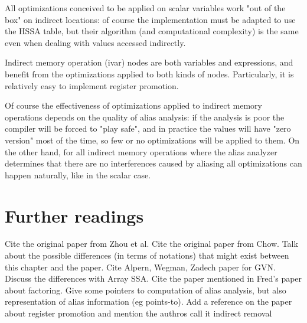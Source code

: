 All optimizations conceived to be applied on scalar variables work "out of the box" on indirect locations: of course the implementation must be adapted to use the HSSA table, but their algorithm (and computational complexity) is the same even when dealing with values accessed indirectly.

Indirect memory operation (ivar) nodes are both variables and expressions, and benefit from the optimizations applied to both kinds of nodes. Particularly, it is relatively easy to implement register promotion.

Of course the effectiveness of optimizations applied to indirect memory operations depends on the quality of alias analysis: if the analysis is poor the compiler will be forced to "play safe", and in practice the values will have "zero version" most of the time, so few or no optimizations will be applied to them.
On the other hand, for all indirect memory operations where the alias analyzer determines that there are no interferences caused by aliasing all optimizations can happen naturally, like in the scalar case.




\section{Further readings}
Cite the original paper from Zhou et al. \cite{ZhouCC11}
Cite the original paper from Chow.
Talk about the possible differences (in terms of notations) that might exist between this chapter and the paper.
Cite Alpern, Wegman, Zadech paper for GVN.
Discuss the differences with Array SSA.
Cite the paper mentioned in Fred's paper about factoring.
Give some pointers to computation of alias analysis, but also representation of alias information (eg points-to).
Add a reference on the paper about register promotion and mention the authros call it indirect removal 
